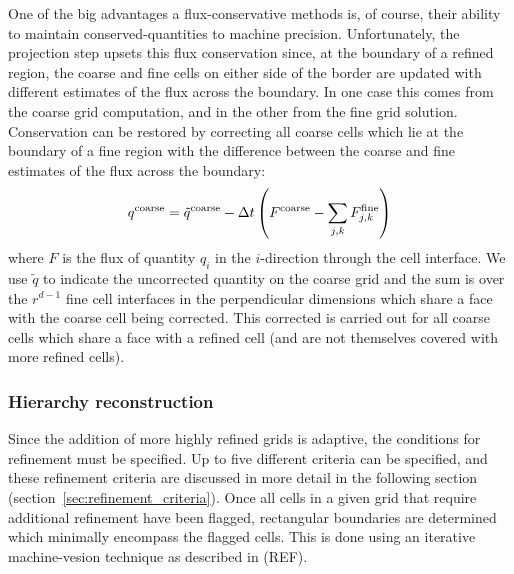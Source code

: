 One of the big advantages a flux-conservative methods is, of course, their ability to maintain conserved-quantities to machine precision.  Unfortunately, the projection step upsets this flux conservation since, at the boundary of a refined region, the coarse and fine cells on either side of the border are updated with different estimates of the flux across the boundary.  In one case this comes from the coarse grid computation, and in the other from the fine grid solution.  Conservation can be restored by correcting all coarse cells which lie at the boundary of a fine region
with the difference between the coarse and fine estimates of the flux across the boundary:
\begin{equation}
  q^{\rm coarse} = \tilde{q}^{\rm coarse} - \Delta t \left( F^{\rm
      coarse} - \sum_{j,k} F^{\rm fine}_{j,k} \right)
\end{equation}
where $F$ is the flux of quantity $q_i$ in the $i$-direction through the cell interface.   We use $\tilde{q}$ to indicate the uncorrected quantity on the coarse grid and the sum is over the $r^{d-1}$ fine cell interfaces in the perpendicular dimensions which share a face with the coarse cell being corrected.  This corrected is carried out for all coarse cells which share a face with a refined cell (and are not themselves covered with more refined cells).

\subsubsection{Hierarchy reconstruction}
\label{sec:hierarchy_reconstruction}


Since the addition of more highly refined grids is adaptive, the conditions for refinement must be specified.  Up to five different criteria can be specified, and these refinement criteria are discussed in more detail in the following section (section~\ref{sec:refinement_criteria}).   Once all cells in a given grid that require additional refinement have been flagged, rectangular boundaries are determined which minimally encompass the flagged cells.  This is done using an iterative machine-vesion technique as described in (REF).  

